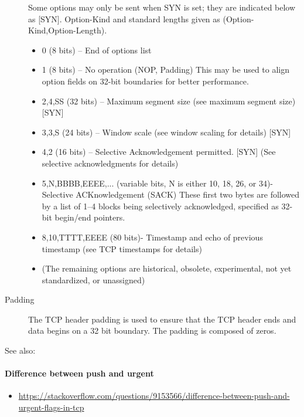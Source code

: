 \begin{description}
  Some options may only be sent when SYN is set; they are indicated below as
  [SYN]. Option-Kind and standard lengths given as (Option-Kind,Option-Length).
  \begin{itemize}
  \item 0 (8 bits) – End of options list
  \item 1 (8 bits) – No operation (NOP, Padding) This may be used to align option fields
    on 32-bit boundaries for better performance.
  \item 2,4,SS (32 bits) – Maximum segment size (see maximum segment size) [SYN]
  \item 3,3,S (24 bits) – Window scale (see window scaling for details)
    [SYN]
  \item 4,2 (16 bits) – Selective Acknowledgement permitted. [SYN] (See selective
    acknowledgments for details)
  \item 5,N,BBBB,EEEE,... (variable bits, N is either 10, 18, 26, or 34)- Selective
    ACKnowledgement (SACK) These first two bytes are
    followed by a list of 1–4 blocks being selectively acknowledged, specified as 32-bit
    begin/end pointers.
  \item 8,10,TTTT,EEEE (80 bits)- Timestamp and echo of previous timestamp (see TCP
    timestamps for details)
  \item[] (The remaining options are historical, obsolete, experimental, not yet
    standardized, or unassigned)
  \end{itemize}
\item[Padding] The TCP header padding is used to ensure that the TCP header ends and data
  begins on a 32 bit boundary. The padding is composed of zeros.
\end{description}

See also: 

\paragraph{Difference between push and urgent}

\begin{itemize}
\item \url{https://stackoverflow.com/questions/9153566/difference-between-push-and-urgent-flags-in-tcp}
\end{itemize}

